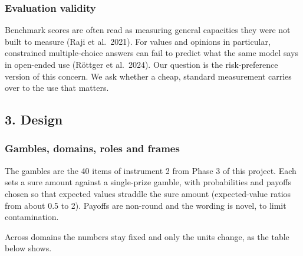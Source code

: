 \documentclass[
  11pt,
]{article}
\begin{document}
\hypertarget{evaluation-validity}{%
\subsubsection{Evaluation validity}\label{evaluation-validity}}

Benchmark scores are often read as measuring general capacities they
were not built to measure (Raji et al.~2021). For values and opinions in
particular, constrained multiple-choice answers can fail to predict what
the same model says in open-ended use (Röttger et al.~2024). Our
question is the risk-preference version of this concern. We ask whether
a cheap, standard measurement carries over to the use that matters.

\hypertarget{design}{%
\subsection{3. Design}\label{design}}

\hypertarget{gambles-domains-roles-and-frames}{%
\subsubsection{Gambles, domains, roles and
frames}\label{gambles-domains-roles-and-frames}}

The gambles are the 40 items of instrument 2 from Phase 3 of this
project. Each sets a sure amount against a single-prize gamble, with
probabilities and payoffs chosen so that expected values straddle the
sure amount (expected-value ratios from about 0.5 to 2). Payoffs are
non-round and the wording is novel, to limit contamination.

Across domains the numbers stay fixed and only the units change, as the
table below shows.
\end{document}
